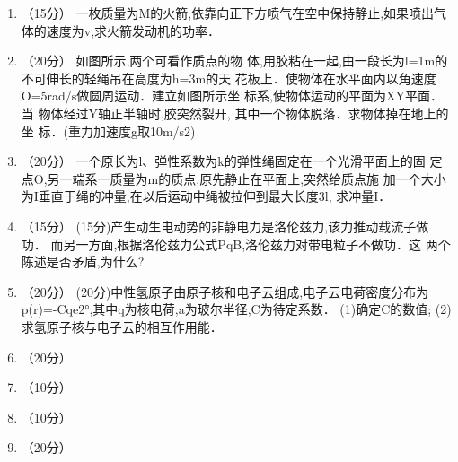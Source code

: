 
\begin{enumerate}
\item （15分）
一枚质量为M的火箭,依靠向正下方喷气在空中保持静止,如果喷出气体的速度为v,求火箭发动机的功率．
\item （20分）
如图所示,两个可看作质点的物
体,用胶粘在一起,由一段长为l=1m的
不可伸长的轻绳吊在高度为h=3m的天
花板上．使物体在水平面内以角速度
O=5rad/s做圆周运动．建立如图所示坐
标系,使物体运动的平面为XY平面．当
物体经过Y轴正半轴时,胶突然裂开,
其中一个物体脱落．求物体掉在地上的坐
标．(重力加速度g取10m/s2)
\item （20分）
一个原长为l、弹性系数为k的弹性绳固定在一个光滑平面上的固
定点O,另一端系一质量为m的质点,原先静止在平面上,突然给质点施
加一个大小为I垂直于绳的冲量,在以后运动中绳被拉伸到最大长度3l,
求冲量I．
\item （15分）
(15分)产生动生电动势的非静电力是洛伦兹力,该力推动载流子做功．
而另一方面,根据洛伦兹力公式PqB,洛伦兹力对带电粒子不做功．这
两个陈述是否矛盾,为什么?
\item （20分）
(20分)中性氢原子由原子核和电子云组成,电子云电荷密度分布为
p(r)=-Cqe2°,其中q为核电荷,a为玻尔半径,C为待定系数．
(1)确定C的数值;
(2)求氢原子核与电子云的相互作用能．
\item （20分）
\item （10分）
\item （10分）
\item （20分） 

\end{enumerate}
